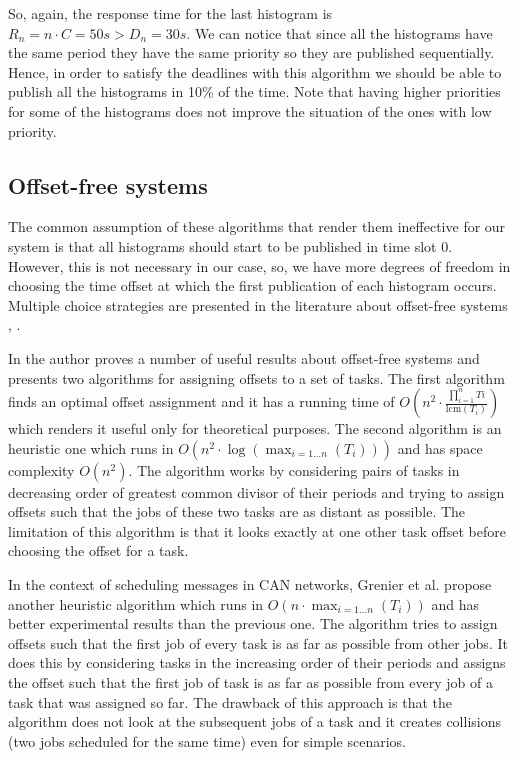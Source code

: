 So, again, the response time for the last histogram is $R_n=n\cdot C=50s > D_n=30s$. We can notice that since all the histograms have the same period they have the same priority so they are published sequentially. Hence, in order to satisfy the deadlines with this algorithm we should be able to publish all the histograms in 10\% of the time. Note that having higher priorities for some of the histograms does not improve the situation of the ones with low priority.

\subsection*{Offset-free systems} 

The common assumption of these algorithms that render them ineffective for our system is that all histograms should start to be published in time slot 0. However, this is not necessary in our case, so, we have more degrees of freedom in choosing the time offset at which the first publication of each histogram occurs. Multiple choice strategies are presented in the literature about offset-free systems \citep{goossens2003scheduling}, \citep{grenier2008pushing}.
 
In \citep{goossens2003scheduling} the author proves a number of useful results about offset-free systems and presents two algorithms for assigning offsets to a set of tasks. The first algorithm finds an optimal offset assignment and it has a running time of $O(n^2 \cdot \frac{\prod_{i=1}^n Ti}{\text{lcm}(T_i)})$ which renders it useful only for theoretical purposes. The second algorithm is an heuristic one which runs in $O(n^2\cdot \log(\max_{i=1\ldots n}(T_i)))$ and has space complexity $O(n^2)$. The algorithm works by considering pairs of tasks in decreasing order of greatest common divisor of their periods and trying to assign offsets such that the jobs of these two tasks are as distant as possible. The limitation of this algorithm is that it looks exactly at one other task offset before choosing the offset for a task.

In the context of scheduling messages in CAN networks, Grenier et al. \citep{grenier2008pushing} propose another heuristic algorithm which runs in $O(n\cdot \max_{i=1 \ldots n}(T_i))$ and has better experimental results than the previous one. The algorithm tries to assign offsets such that the first job of every task is as far as possible from other jobs. It does this by considering tasks in the increasing order of their periods and assigns the offset such that the first job of task is as far as possible from every job of a task that was assigned so far. The drawback of this approach is that the algorithm does not look at the subsequent jobs of a task and it creates collisions (two jobs scheduled for the same time) even for simple scenarios.

